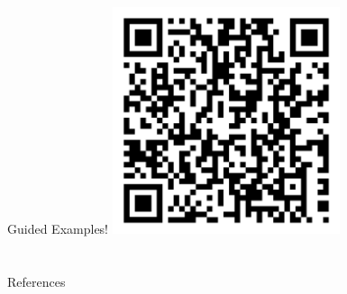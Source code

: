 \documentclass[presentation, 9pt]{beamer}\mode<presentation>{\usetheme{AMSBolognaFC}}
\begin{document}


\begin{frame}{Guided Examples!}
\centering
\includegraphics[width=0.5\textwidth]{img/qr-code-today.png}
\end{frame}
\section{}


\frame{\titlepage}

\section*{\refname}



\begin{frame}[allowframebreaks]{References}
\def\bibfont{\footnotesize}
\printbibliography
\end{frame}

\end{document}
